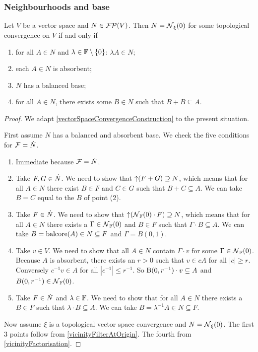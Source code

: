 \subsubsection{Neighbourhoods and base}
\begin{proposition} \label{TVSconstruction}
Let $V$ be a vector space and $N\in\operatorname{\mathcal{FP}}(V)$. Then $N = \operatorname{\mathcal{N}}_\xi(0)$ for some topological convergence on $V$ \textup{if and only if}
\begin{enumerate}
\item for all $A\in N$ and $\lambda\in \mathbb{F}\setminus\{0\}$: $\lambda A\in N$;
\item each $A \in N$ is absorbent;
\item $N$ has a balanced base;
\item for all $A\in N$, there exists some $B\in N$ such that $B+B\subseteq A$.
\end{enumerate}
\end{proposition}
\begin{proof}
We adapt \ref{vectorSpaceConvergenceConstruction} to the present situation.

First assume $N$ has a balanced and absorbent base. We check the five conditions for $\mathcal{F} = \dot{N}$.

\begin{enumerate}
\item Immediate because $\mathcal{F} = \dot{N}$.
\item Take $F,G\in \dot{N}$. We need to show that $\operatorname{\uparrow} (F + G) \supseteq N$, which means that for all $A \in N$ there exist $B\in F$ and $C\in G$ such that $B+C\subseteq A$. We can take $B = C$ equal to the $B$ of point (2).
\item Take $F\in \dot{N}$. We need to show that $\operatorname{\uparrow}(\operatorname{\mathcal{N}}_{\mathbb{F}}(0)\cdot F) \supseteq N$, which means that for all $A\in N$ there exists a $\Gamma\in \operatorname{\mathcal{N}}_{\mathbb{F}}(0)$ and $B\in F$ such that $\Gamma \cdot B\subseteq A$. We can take $B = \operatorname{balcore}(A) \in N \subseteq F$ and $\Gamma = B(0,1)$.
\item Take $v\in V$. We need to show that all $A\in N$ contain $\Gamma\cdot v$ for some $\Gamma \in \operatorname{\mathcal{N}}_{\mathbb{F}}(0)$. Because $A$ is absorbent, there exists an $r>0$ such that $v\in cA$ for all $|c|\geq r$. Conversely $c^{-1}v \in A$ for all $|c^{-1}| \leq r^{-1}$. So $\operatorname{B}(0,r^{-1})\cdot v \subseteq A$ and $B(0,r^{-1}) \in \operatorname{\mathcal{N}}_{\mathbb{F}}(0)$.
\item Take $F\in \dot{N}$ and $\lambda\in \mathbb{F}$. We need to show that for all $A\in N$ there exists a $B\in F$ such that $\lambda\cdot B\subseteq A$. We can take $B = \lambda^{-1}A \in N\subseteq F$.
\end{enumerate}

Now assume $\xi$ is a topological vector space convergence and $N = \operatorname{\mathcal{N}}_\xi(0)$. The first 3 points follow from \ref{vicinityFilterAtOrigin}. The fourth from \ref{vicinityFactorisation}.
\end{proof}
